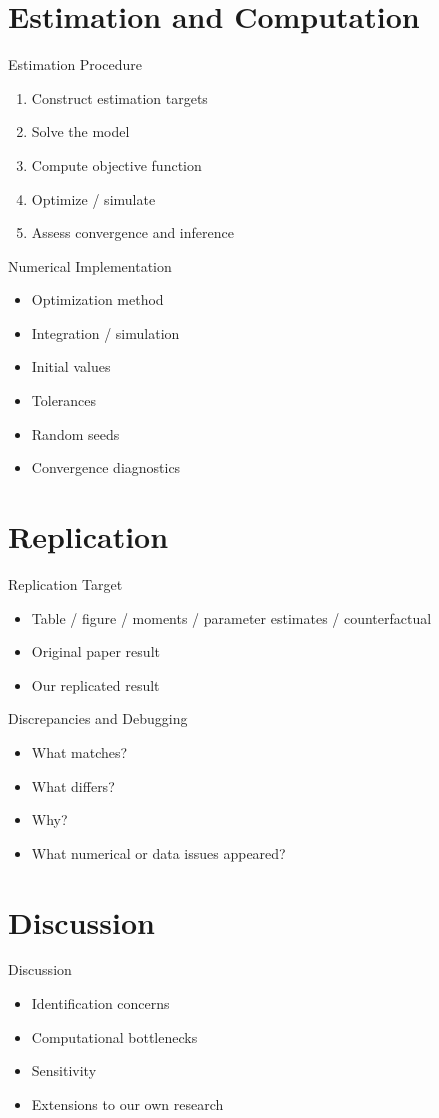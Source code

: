 \documentclass[aspectratio=169]{beamer}
\begin{document}
\section{Estimation and Computation}

\begin{frame}{Estimation Procedure}
\begin{enumerate}
    \item Construct estimation targets
    \item Solve the model
    \item Compute objective function
    \item Optimize / simulate
    \item Assess convergence and inference
\end{enumerate}
\end{frame}

\begin{frame}{Numerical Implementation}
\begin{itemize}
    \item Optimization method
    \item Integration / simulation
    \item Initial values
    \item Tolerances
    \item Random seeds
    \item Convergence diagnostics
\end{itemize}
\end{frame}

\section{Replication}

\begin{frame}{Replication Target}
\begin{itemize}
    \item Table / figure / moments / parameter estimates / counterfactual
    \item Original paper result
    \item Our replicated result
\end{itemize}
\end{frame}

\begin{frame}{Discrepancies and Debugging}
\begin{itemize}
    \item What matches?
    \item What differs?
    \item Why?
    \item What numerical or data issues appeared?
\end{itemize}
\end{frame}

\section{Discussion}

\begin{frame}{Discussion}
\begin{itemize}
    \item Identification concerns
    \item Computational bottlenecks
    \item Sensitivity
    \item Extensions to our own research
\end{itemize}
\end{frame}
\end{document}
